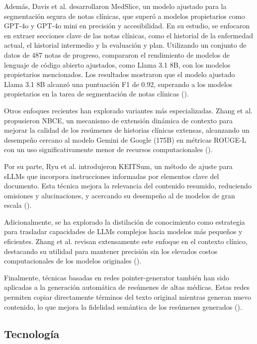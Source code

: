 \documentclass[../main.tex]{subfiles}
\begin{document}
Además, Davis et al. desarrollaron MedSlice, un modelo ajustado para la segmentación segura de notas clínicas, que superó a modelos propietarios como GPT-4o y GPT-4o mini en precisión y accesibilidad. En su estudio, se enfocaron en extraer secciones clave de las notas clínicas, como el historial de la enfermedad actual, el historial intermedio y la evaluación y plan. Utilizando un conjunto de datos de 487 notas de progreso, compararon el rendimiento de modelos de lenguaje de código abierto ajustados, como Llama 3.1 8B, con los modelos propietarios mencionados. Los resultados mostraron que el modelo ajustado Llama 3.1 8B alcanzó una puntuación F1 de 0.92, superando a los modelos propietarios en la tarea de segmentación de notas clínicas (\cite{davis2025medslicefinetunedlargelanguage}).


Otros enfoques recientes han explorado variantes más especializadas. Zhang et al. propusieron NBCE, un mecanismo de extensión dinámica de contexto para mejorar la calidad de los resúmenes de historias clínicas extensas, alcanzando un desempeño cercano al modelo Gemini de Google (175B) en métricas ROUGE-L con un uso significativamente menor de recursos computacionales (\cite{zhang2024optimizingautomaticsummarizationlong}).

Por su parte, Ryu et al. introdujeron KEITSum, un método de ajuste para sLLMs que incorpora instrucciones informadas por elementos clave del documento. Esta técnica mejora la relevancia del contenido resumido, reduciendo omisiones y alucinaciones, y acercando su desempeño al de modelos de gran escala (\cite{ryu2024keyelementinformedsllmtuningdocument}).

Adicionalmente, se ha explorado la distilación de conocimiento como estrategia para trasladar capacidades de LLMs complejos hacia modelos más pequeños y eficientes. Zhang et al. revisan extensamente este enfoque en el contexto clínico, destacando su utilidad para mantener precisión sin los elevados costos computacionales de los modelos originales (\cite{zhang2025comprehensivesurveyprocessorientedautomatic}).

Finalmente, técnicas basadas en redes pointer-generator también han sido aplicadas a la generación automática de resúmenes de altas médicas. Estas redes permiten copiar directamente términos del texto original mientras generan nuevo contenido, lo que mejora la fidelidad semántica de los resúmenes generados (\cite{10.1007/978-981-99-9864-7_17}).



\subsection{Tecnología}
\end{document}
